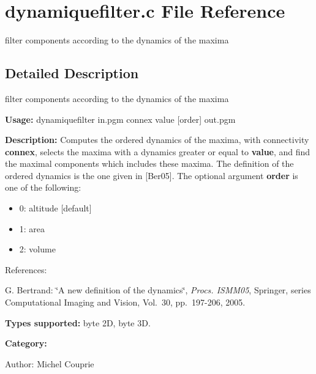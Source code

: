 \section{dynamiquefilter.c File Reference}
\label{dynamiquefilter_8c}
filter components according to the dynamics of the maxima 



\subsection{Detailed Description}
filter components according to the dynamics of the maxima 

{\bf Usage:} dynamiquefilter in.pgm connex value [order] out.pgm

{\bf Description:} Computes the ordered dynamics of the maxima, with connectivity {\bf connex}, selects the maxima with a dynamics greater or equal to {\bf value}, and find the maximal components which includes these maxima. The definition of the ordered dynamics is the one given in [Ber05]. The optional argument {\bf order} is one of the following: \begin{itemize}
\item 0: altitude [default] \item 1: area \item 2: volume\end{itemize}
References:\par
 [Ber05] G. Bertrand: \char`\"{}A new definition of the dynamics\char`\"{}, {\em Procs. ISMM05\/}, Springer, series Computational Imaging and Vision, Vol.~30, pp.~197-206, 2005.\par


{\bf Types supported:} byte 2D, byte 3D.

{\bf Category:}

\begin{Desc}
\item[Author:]Michel Couprie \end{Desc}
